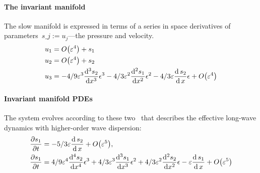 \paragraph{The invariant manifold} 
The slow manifold is expressed in terms of a series in space derivatives of parameters~\(s\_ j:=u_j\)---the pressure and velocity.
\begin{align*}&
u_{1}={ O\big(\varepsilon ^{4}\big)+s_{1}
}\\&
u_{2}={ O\big(\varepsilon ^{4}\big)+s_{2}
}\\&
u_{3}={ -4/9 \varepsilon^{3} \frac{{\rm d}^{3}s_{2}}{{\rm d}x^{3}} \epsilon ^{3}-
4/3 \varepsilon^{2} \frac{{\rm d}^{2}s_{1}}{{\rm d}x^{2}} \epsilon ^{2}-4/3 
\varepsilon \frac{{\rm d}\,s_{2}}{{\rm d}\,x} \epsilon +O\big(\varepsilon ^{4}
\big)
}\end{align*}

 
\paragraph{Invariant manifold PDEs} 
The system evolves according to these two \pde\ that describes the effective long-wave dynamics with higher-order wave dispersion:
\begin{align*}&
\D t{s_{1}}={ -5/3 \eps \frac{{\rm d}\,s_{2}}{{\rm d}\,x}+O\big(
\varepsilon ^{5}\big),
}\\&
\D t{s_{1}}={ 4/9 \eps^{4} \frac{{\rm d}^{4}s_{2}}{{\rm d}x^{4}} \epsilon 
^{3}+4/3 \eps^{3} \frac{{\rm d}^{3}s_{1}}{{\rm d}x^{3}} \epsilon ^{2}+4/
3 \eps^{2} \frac{{\rm d}^{2}s_{2}}{{\rm d}x^{2}} \epsilon -\eps \frac{
{\rm d}\,s_{1}}{{\rm d}\,x}+O\big(\varepsilon ^{5}\big)
}\end{align*}



